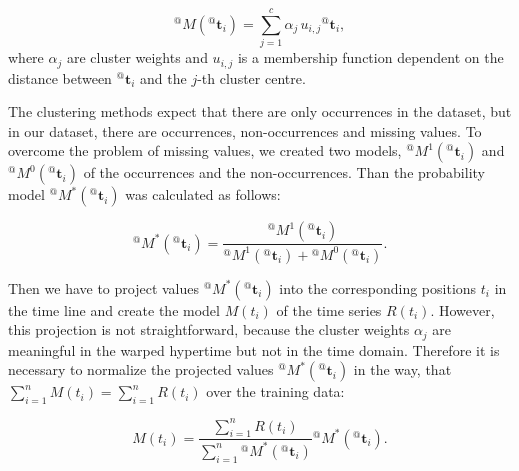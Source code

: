 \begin{equation}\label{eq:modelWHyTe}
{}^{@}M({}^{@}\mathbf{t}_{i}) =  \sum_{j=1}^{c}{\alpha_j\,u_{i,j}{}^{@}\mathbf{t}_{i}},
\end{equation}
%
\noindent where $\alpha_{j}$ are cluster weights and $u_{i,j}$ is a membership function dependent on the distance between ${}^{@}\mathbf{t}_{i}$ and the $j$-th cluster centre.

The clustering methods expect that there are only occurrences in the dataset, but in our dataset, there are occurrences, non-occurrences and missing values.
To overcome the problem of missing values, we created two models, ${}^{@}M^{1}({}^{@}\mathbf{t}_{i})$ and ${}^{@}M^{0}({}^{@}\mathbf{t}_{i})$ of the occurrences and the non-occurrences.
Than the probability model ${}^{@}M^{*}({}^{@}\mathbf{t}_{i})$ was calculated as follows:

\begin{equation}\label{eq:probabilityWHyTe}
{}^{@}M^{*}({}^{@}\mathbf{t}_{i}) = \frac{{}^{@}M^{1}({}^{@}\mathbf{t}_{i})}{{}^{@}M^{1}({}^{@}\mathbf{t}_{i}) + {}^{@}M^{0}({}^{@}\mathbf{t}_{i})}.
\end{equation}

Then we have to project values ${}^{@}M^{*}({}^{@}\mathbf{t}_{i})$ into the corresponding positions $t_{i}$ in the time line and create the model $M(t_{i})$ of the time series $R(t_{i})$.
However, this projection is not straightforward, because the cluster weights $\alpha_{j}$ are meaningful in the warped hypertime but not in the time domain.
Therefore it is necessary to normalize the projected values ${}^{@}M^{*}({}^{@}\mathbf{t}_{i})$ in the way, that $\sum^{n}_{i=1}{M(t_{i})} = \sum^{n}_{i=1}{R(t_{i})}$ over the training data:

\begin{equation}\label{eq:modelNormalisation}
M(t_{i}) = \frac{\sum^{n}_{i=1}{R(t_{i})}}{ \sum^{n}_{i=1}{{}^{@}M^{*}({}^{@}\mathbf{t}_{i})}}{}^{@}M^{*}({}^{@}\mathbf{t}_{i}).
\end{equation}






